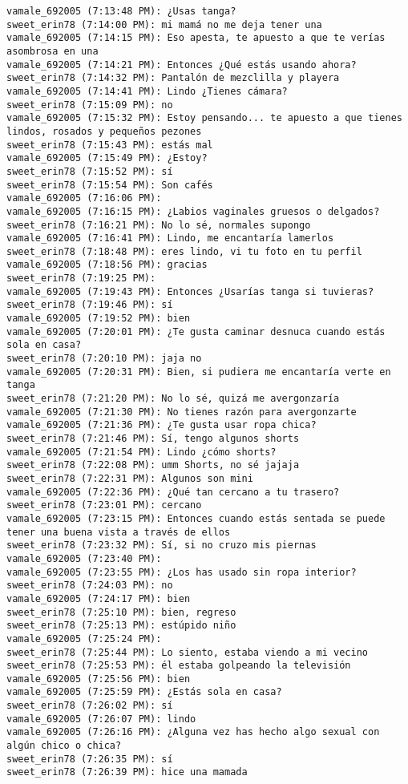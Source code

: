 \begin{verbatim}
vamale_692005 (7:13:48 PM): ¿Usas tanga?
sweet_erin78 (7:14:00 PM): mi mamá no me deja tener una
vamale_692005 (7:14:15 PM): Eso apesta, te apuesto a que te verías asombrosa en una
vamale_692005 (7:14:21 PM): Entonces ¿Qué estás usando ahora?
sweet_erin78 (7:14:32 PM): Pantalón de mezclilla y playera
vamale_692005 (7:14:41 PM): Lindo ¿Tienes cámara?
sweet_erin78 (7:15:09 PM): no
vamale_692005 (7:15:32 PM): Estoy pensando... te apuesto a que tienes lindos, rosados y pequeños pezones
sweet_erin78 (7:15:43 PM): estás mal
vamale_692005 (7:15:49 PM): ¿Estoy?
sweet_erin78 (7:15:52 PM): sí
sweet_erin78 (7:15:54 PM): Son cafés
vamale_692005 (7:16:06 PM): 
vamale_692005 (7:16:15 PM): ¿Labios vaginales gruesos o delgados?
sweet_erin78 (7:16:21 PM): No lo sé, normales supongo
vamale_692005 (7:16:41 PM): Lindo, me encantaría lamerlos
sweet_erin78 (7:18:48 PM): eres lindo, vi tu foto en tu perfil
vamale_692005 (7:18:56 PM): gracias
sweet_erin78 (7:19:25 PM): 
vamale_692005 (7:19:43 PM): Entonces ¿Usarías tanga si tuvieras?
sweet_erin78 (7:19:46 PM): sí
vamale_692005 (7:19:52 PM): bien
vamale_692005 (7:20:01 PM): ¿Te gusta caminar desnuca cuando estás sola en casa?
sweet_erin78 (7:20:10 PM): jaja no
vamale_692005 (7:20:31 PM): Bien, si pudiera me encantaría verte en tanga
sweet_erin78 (7:21:20 PM): No lo sé, quizá me avergonzaría
vamale_692005 (7:21:30 PM): No tienes razón para avergonzarte
vamale_692005 (7:21:36 PM): ¿Te gusta usar ropa chica?
sweet_erin78 (7:21:46 PM): Sí, tengo algunos shorts
vamale_692005 (7:21:54 PM): Lindo ¿cómo shorts?
sweet_erin78 (7:22:08 PM): umm Shorts, no sé jajaja
sweet_erin78 (7:22:31 PM): Algunos son mini
vamale_692005 (7:22:36 PM): ¿Qué tan cercano a tu trasero?
sweet_erin78 (7:23:01 PM): cercano
vamale_692005 (7:23:15 PM): Entonces cuando estás sentada se puede tener una buena vista a través de ellos
sweet_erin78 (7:23:32 PM): Sí, si no cruzo mis piernas
vamale_692005 (7:23:40 PM): 
vamale_692005 (7:23:55 PM): ¿Los has usado sin ropa interior?
sweet_erin78 (7:24:03 PM): no
vamale_692005 (7:24:17 PM): bien
sweet_erin78 (7:25:10 PM): bien, regreso
sweet_erin78 (7:25:13 PM): estúpido niño
vamale_692005 (7:25:24 PM): 
sweet_erin78 (7:25:44 PM): Lo siento, estaba viendo a mi vecino
sweet_erin78 (7:25:53 PM): él estaba golpeando la televisión
vamale_692005 (7:25:56 PM): bien
vamale_692005 (7:25:59 PM): ¿Estás sola en casa?
sweet_erin78 (7:26:02 PM): sí
vamale_692005 (7:26:07 PM): lindo
vamale_692005 (7:26:16 PM): ¿Alguna vez has hecho algo sexual con algún chico o chica?
sweet_erin78 (7:26:35 PM): sí
sweet_erin78 (7:26:39 PM): hice una mamada

\end{verbatim}
